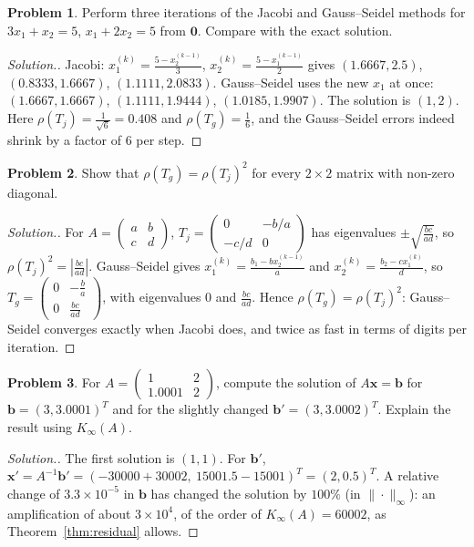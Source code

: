 \documentclass[11pt,a4paper]{article}
\numberwithin{equation}{section}
\theoremstyle{definition}
\newtheorem{problemx}{Problem}[subsection]
\newenvironment{problem}{\begin{problemx}}{\end{problemx}}
\newenvironment{solution}
  {\renewcommand{\qedsymbol}{}\begin{proof}[\textit{Solution}.]}
  {\end{proof}}
\begin{document}
\begin{problem}
Perform three iterations of the Jacobi and Gauss--Seidel methods for $3x_1+x_2 = 5$, $x_1+2x_2 = 5$ from $\mathbf 0$. Compare with the exact
solution.
\end{problem}
\begin{solution}
Jacobi: $x_1^{(k)} = \frac{5-x_2^{(k-1)}}{3}$, $x_2^{(k)} = \frac{5-x_1^{(k-1)}}{2}$ gives $(1.6667,2.5)$, $(0.8333,1.6667)$, $(1.1111,2.0833)$.
Gauss--Seidel uses the new $x_1$ at once: $(1.6667,1.6667)$, $(1.1111,1.9444)$, $(1.0185,1.9907)$. The solution is $(1,2)$. Here
$\rho(T_j) = \frac1{\sqrt6} = 0.408$ and $\rho(T_g) = \frac16$, and the Gauss--Seidel errors indeed shrink by a factor of $6$ per step.
\end{solution}

\begin{problem}
Show that $\rho(T_g) = \rho(T_j)^2$ for every $2\times2$ matrix with non-zero diagonal.
\end{problem}
\begin{solution}
For $A = \begin{pmatrix}a&b\\c&d\end{pmatrix}$, $T_j = \begin{pmatrix}0&-b/a\\-c/d&0\end{pmatrix}$ has eigenvalues $\pm\sqrt{\frac{bc}{ad}}$, so
$\rho(T_j)^2 = \left|\frac{bc}{ad}\right|$. Gauss--Seidel gives $x_1^{(k)} = \frac{b_1-bx_2^{(k-1)}}{a}$ and $x_2^{(k)} = \frac{b_2-cx_1^{(k)}}{d}$, so
$T_g = \begin{pmatrix}0&-\frac ba\\0&\frac{bc}{ad}\end{pmatrix}$, with eigenvalues $0$ and $\frac{bc}{ad}$. Hence $\rho(T_g) = \rho(T_j)^2$: Gauss--Seidel
converges exactly when Jacobi does, and twice as fast in terms of digits per iteration.
\end{solution}

\begin{problem}
For $A = \begin{pmatrix}1&2\\1.0001&2\end{pmatrix}$, compute the solution of $A\mathbf x = \mathbf b$ for $\mathbf b = (3,3.0001)^T$ and for the slightly
changed $\mathbf b' = (3,3.0002)^T$. Explain the result using $K_\infty(A)$.
\end{problem}
\begin{solution}
The first solution is $(1,1)$. For $\mathbf b'$, $\mathbf x' = A^{-1}\mathbf b' = (-30000+30002,\ 15001.5-15001)^T = (2,0.5)^T$. A relative change of
$3.3\times10^{-5}$ in $\mathbf b$ has changed the solution by $100\%$ (in $\|\cdot\|_\infty$): an amplification of about $3\times10^4$, of the order of
$K_\infty(A) = 60002$, as Theorem~\ref{thm:residual} allows.
\end{solution}
\end{document}
